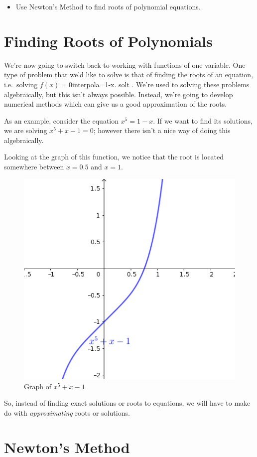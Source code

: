 \documentclass[
]{book}
\providecommand{\tightlist}{%
  \setlength{\itemsep}{0pt}\setlength{\parskip}{0pt}}
\theoremstyle{definition}
\theoremstyle{definition}
\theoremstyle{definition}
\theoremstyle{definition}
\theoremstyle{remark}
\begin{document}
\begin{itemize}
\tightlist
\item
  Use Newton's Method to find roots of polynomial equations.
\end{itemize}

\hypertarget{finding-roots-of-polynomials}{%
\section{Finding Roots of Polynomials}\label{finding-roots-of-polynomials}}

We're now going to switch back to working with functions of one variable. One type of problem that we'd like to solve is that of finding the roots of an equation, i.e.~solving \(f(x)=0\)interpola=1-x. solt . We're used to solving these problems algebraically, but this isn't always possible. Instead, we're going to develop numerical methods which can give us a good approximation of the roots.

As an example, consider the equation \(x^5=1-x\). If we want to find its solutions, we are solving \(x^5+x-1=0\); however there isn't a nice way of doing this algebraically.

Looking at the graph of this function, we notice that the root is located somewhere between \(x=0.5\) and \(x=1\).

\begin{figure}

{\centering \includegraphics[width=0.5\linewidth]{images/lec-18-ex-1} 

}

\caption{Graph of $x^5+x-1$}\label{fig:unnamed-chunk-31}
\end{figure}

So, instead of finding exact solutions or roots to equations, we will have to make do with \emph{approximating} roots or solutions.

\hypertarget{newtons-method}{%
\section{Newton's Method}\label{newtons-method}}
\end{document}
